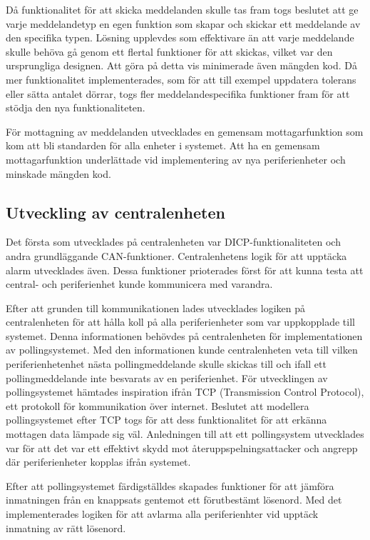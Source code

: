 \documentclass[a4paper]{article}
\begin{document}
Då funktionalitet för att skicka meddelanden skulle tas fram togs beslutet att ge varje meddelandetyp en egen funktion som skapar och skickar ett meddelande av den specifika typen.
Lösning upplevdes som effektivare än att varje meddelande skulle behöva gå genom ett flertal funktioner för att skickas, vilket var den ursprungliga designen.
Att göra på detta vis minimerade även mängden kod.
Då mer funktionalitet implementerades, som för att till exempel uppdatera tolerans eller sätta antalet dörrar, togs fler meddelandespecifika funktioner fram för att stödja den nya funktionaliteten.

För mottagning av meddelanden utvecklades  en gemensam mottagarfunktion som kom att bli standarden för alla enheter i systemet.
Att ha en gemensam mottagarfunktion underlättade vid implementering av nya periferienheter och minskade mängden kod.


\subsection{Utveckling av centralenheten}
Det första som utvecklades på centralenheten var DICP-funktionaliteten och andra grundläggande CAN-funktioner. Centralenhetens logik för att upptäcka alarm utvecklades även. Dessa funktioner prioterades först för att kunna testa att central- och periferienhet kunde kommunicera med varandra.

Efter att grunden till kommunikationen lades utvecklades logiken på centralenheten för att hålla koll på alla periferienheter som var uppkopplade till systemet. Denna informationen behövdes på centralenheten för implementationen av pollingsystemet. Med den informationen kunde centralenheten veta till vilken periferienhetenhet nästa pollingmeddelande skulle skickas till och ifall ett pollingmeddelande inte besvarats av en periferienhet. För utvecklingen av pollingsystemet hämtades inspiration ifrån TCP (Transmission Control Protocol), ett protokoll för kommunikation över internet. Beslutet att modellera pollingsystemet efter TCP togs för att dess funktionalitet för att erkänna mottagen data lämpade sig väl. Anledningen till att ett pollingsystem utvecklades var för att det var ett effektivt skydd mot återuppspelningsattacker och angrepp där periferienheter kopplas ifrån systemet.

Efter att pollingsystemet färdigställdes skapades funktioner för att jämföra inmatningen från en knappsats gentemot ett förutbestämt lösenord. Med det implementerades logiken för att avlarma alla periferienhter vid upptäck inmatning av rätt lösenord.
\end{document}
